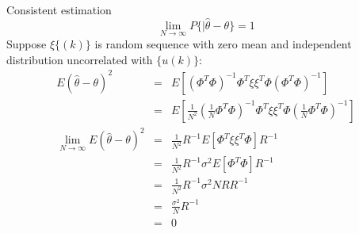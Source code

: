 \begin{frame}{ Consistent estimation }
$$
\lim_{N\rightarrow\infty}P\{|\hat\theta-\theta\}=1
$$
Suppose $\xi\{(k)\}$ is random sequence with zero mean and independent distribution uncorrelated with $\{u(k)\}$:
\begin{eqnarray*}
 E(\hat\theta-\theta)^2 &=& E[(\Phi^T\Phi)^{-1}\Phi^T\xi\xi^T\Phi(\Phi^T\Phi)^{-1}] \\
 &=& E[\frac{1}{N^2}(\frac{1}{N}\Phi^T\Phi)^{-1}\Phi^T\xi\xi^T \Phi(\frac{1}{N}\Phi^T\Phi)^{-1}] \\
   \lim_{N\rightarrow\infty}E(\hat\theta-\theta)^2  &=& \frac{1}{N^2}R^{-1}E[\Phi^T\xi\xi^T\Phi] R^{-1} \\
  &=& \frac{1}{N^2}R^{-1}\sigma^2 E[\Phi^T\Phi] R^{-1} \\
  &=& \frac{1}{N^2}R^{-1}\sigma^2 N R R^{-1} \\
  &=& \frac{\sigma^2}{N}R^{-1} \\
  &=& 0
\end{eqnarray*}
\end{frame}

